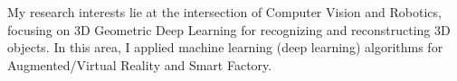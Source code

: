 


\begin{cventries}

\cvtext
{ %
\begin{cvitems}
My research interests lie at the intersection of Computer Vision and Robotics, focusing on 3D Geometric Deep Learning for recognizing and reconstructing 3D objects. In this area, I applied machine learning (deep learning) algorithms for Augmented/Virtual Reality and Smart Factory.
\end{cvitems}
}


\end{cventries}